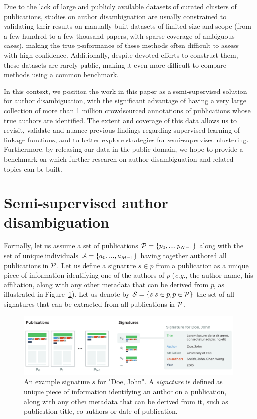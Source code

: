 \documentclass[conference]{IEEEtran}
\newcommand{\eg}{\emph{e.g.}\xspace}
\begin{document}
Due to the lack of large and publicly available datasets of curated
clusters of publications, studies on author disambiguation are usually
constrained to validating their results on manually built datasets of limited
size and scope (from a few hundred to a few thousand papers, with sparse
coverage of ambiguous cases), making the true performance of these methods
often difficult to assess with high confidence.
Additionally, despite devoted efforts to construct them, these datasets are rarely public,
making it even more difficult to compare methods using a common benchmark.

In this context, we position the work in this paper as a
semi-supervised solution for author disambiguation, with the significant
advantage of having a very large collection of more than 1 million crowdsourced annotations
of publications whose true authors are identified.
The extent and coverage of this data allows us to revisit, validate and nuance previous
findings regarding supervised learning of linkage functions, and to better explore strategies
for semi-supervised clustering.
Furthermore, by releasing our data in the public domain, we hope to provide a benchmark on
which further research on author disambiguation and related topics can be built.




\section{Semi-supervised author disambiguation}
\label{methods}

Formally, let us assume a set of publications ${\cal P} = \{ p_0, ...,
p_{N-1}\}$ along with the set of unique individuals ${\cal A} = \{ a_0, ...,
a_{M-1}\}$ having together authored all publications in ${\cal P}$.  Let us
define a signature $s \in p$ from a publication as a unique piece of
information identifying one of the authors of $p$ (\eg, the author name, his
affiliation, along with any other metadata that can be derived from $p$, as illustrated in Figure~\ref{fig:signature}). Let us
denote by ${\cal S} = \{ s | s \in p, p \in {\cal P} \}$ the set of all
signatures that can be extracted from all publications in ${\cal P}$.

\begin{figure}
\centering
\includegraphics[width=\linewidth]{fig-pub-to-signature}
\caption{An example signature $s$ for "Doe, John". A \textit{signature} is
defined as unique piece of information identifying an author on a publication,
along with any other metadata that can be derived from it, such as publication
title, co-authors or date of publication.}
\label{fig:signature}
\end{figure}
\end{document}
